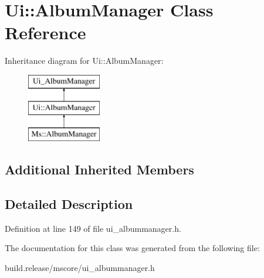\hypertarget{class_ui_1_1_album_manager}{}\section{Ui\+:\+:Album\+Manager Class Reference}
\label{class_ui_1_1_album_manager}
Inheritance diagram for Ui\+:\+:Album\+Manager\+:\begin{figure}[H]
\begin{center}
\leavevmode
\includegraphics[height=3.000000cm]{class_ui_1_1_album_manager}
\end{center}
\end{figure}
\subsection*{Additional Inherited Members}


\subsection{Detailed Description}


Definition at line 149 of file ui\+\_\+albummanager.\+h.



The documentation for this class was generated from the following file\+:\begin{DoxyCompactItemize}
\item 
build.\+release/mscore/ui\+\_\+albummanager.\+h\end{DoxyCompactItemize}
